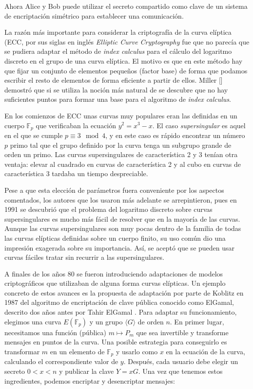 \documentclass[
  a4paper,
  12pt,
  spanish,
]{scrartcl}
\begin{document}
Ahora Alice y Bob puede utilizar el secreto compartido como clave de un sistema de encriptación simétrico para establecer una comunicación.


    La razón más importante para considerar la criptografía de la curva elíptica (ECC, por sus siglas en inglés \textit{Elliptic Curve Cryptography} fue que no parecía que se pudiera adaptar el método de \textit{index calculus} para el cálculo del logaritmo discreto en el grupo de una curva elíptica. El motivo es que en este método hay que fijar un conjunto de elementos pequeños (factor base) de forma que podamos escribir el resto de elementos de forma eficiente a partir de ellos. Miller [] demostró que si se utiliza la noción más natural de  se descubre que no hay suficientes puntos para formar una base para el algoritmo de \textit{index calculus}.

En los comienzos de ECC unas curvas muy populares eran las definidas en un cuerpo $\mathbb{F}_p$ que verificaban la ecuación $y^2 = x^3 - x$. El caso \textit{supersingular} es aquel en el que se cumple $p \equiv 3 \mod 4$, y en este caso es rápido encontrar un número $p$ primo tal que el grupo definido por la curva tenga un subgrupo grande de orden un primo. Las curvas supersingulares de característica 2 y 3 tenían otra ventaja: elevar al cuadrado en curvas de característica 2 y al cubo en curvas de característica 3 tardaba un tiempo despreciable.

Pese a que esta elección de parámetros fuera conveniente por los aspectos comentados, los autores que los usaron más adelante se arrepintieron, pues en 1991 se descubrió que el problema del logaritmo discreto sobre curvas supersingulares es mucho más fácil de resolver que en la mayoría de las curvas. Aunque las curvas supersingulares son muy pocas dentro de la familia de todas las curvas elípticas definidas sobre un cuerpo finito, su uso común dio una impresión exagerada sobre su importancia. Así, se aceptó que se pueden usar curvas fáciles tratar sin recurrir a las supersingulares.

A finales de los años 80 se fueron introduciendo adaptaciones de modelos criptográficos que utilizaban de alguna forma curvas elípticas. Un ejemplo concreto de estos avances es la propuesta de adaptación por parte de Koblitz en 1987 \parencite{koblitz_elgamal_1987} del algoritmo de encriptación de clave pública conocido como ElGamal, descrito dos años antes por Tahir ElGamal \parencite{elgamal_cryptosytem_1985}. Para adaptar su funcionamiento, elegimos una curva $E(\mathbb{F}_p)$ y un grupo $\langle G \rangle$ de orden $n$. En primer lugar, necesitamos una función (pública) $m \mapsto P_m$ que sea invertible y transforme mensajes en puntos de la curva. Una posible estrategia para conseguirlo es transformar $m$ en un elemento de $\mathbb{F}_p$ y usarlo como $x$ en la ecuación de la curva, calculando el correspondiente valor de $y$. Después, cada usuario debe elegir un secreto $0 < x < n$ y publicar la clave $Y = xG$. Una vez que tenemos estos ingredientes, podemos encriptar y desencriptar mensajes:
    
\end{document}
